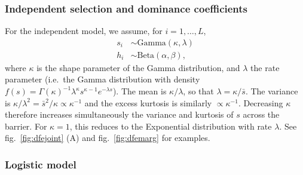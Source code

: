 \documentclass[
  11pt,
]{article}
\begin{document}
\hypertarget{independent-selection-and-dominance-coefficients}{%
\subsubsection{Independent selection and dominance
coefficients}\label{independent-selection-and-dominance-coefficients}}

For the independent model, we assume, for \(i=1,\dots,L\),
\begin{align*}
    s_i &\sim \mathrm{Gamma}(\kappa, \lambda) \\
    h_i &\sim \mathrm{Beta}(\alpha, \beta),
\end{align*} where \(\kappa\) is the shape parameter of the Gamma
distribution, and \(\lambda\) the rate parameter (i.e.~the Gamma
distribution with density
\(f(s) = \Gamma(\kappa)^{-1}\lambda^{\kappa} s^{\kappa-1}e^{-\lambda s}\)).
The mean is \(\kappa/\lambda\), so that \(\lambda = \kappa/\bar{s}\).
The variance is
\(\kappa/\lambda^2 = \bar{s}^2/\kappa \propto \kappa^{-1}\) and the
excess kurtosis is similarly \(\propto \kappa^{-1}\). Decreasing
\(\kappa\) therefore increases simultaneously the variance and kurtosis
of \(s\) across the barrier. For \(\kappa = 1\), this reduces to the
Exponential distribution with rate \(\lambda\). See
fig.~\ref{fig:dfejoint} (A) and fig.~\ref{fig:dfemarg} for examples.

\hypertarget{logistic-model}{%
\subsubsection{Logistic model}\label{logistic-model}}
\end{document}

